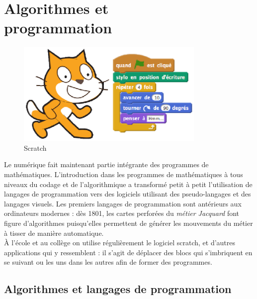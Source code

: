 \chapter{Algorithmes et\\programmation} \label{T15}

\newcommand{\fourmi}[3]{\rput{#3}(#1,#2){\psdot[linecolor=red,dotstyle=triangle*,linewidth=1mm](0,0)}}

\bigskip

\begin{figure}[h]
   \centering
      \includegraphics[height=5cm]{Transversal/Images/T15_intro_Scratch}
   \caption{Scratch}
\end{figure}

\begin{prerequis}
   Le numérique fait maintenant partie intégrante des programmes de mathématiques. L'introduction dans les programmes de mathématiques à tous niveaux du codage et de l'algorithmique a transformé petit à petit l'utilisation de langages de programmation vers des logiciels utilisant des pseudo-langages et des langages visuels.
   Les premiers langages de programmation sont antérieurs aux ordinateurs modernes : dès 1801, les cartes perforées du {\it métier Jacquard} font figure d'algorithmes puisqu'elles permettent de générer les mouvements du métier à tisser de manière automatique. \\
   À l'école et au collège on utilise régulièrement le logiciel scratch, et d'autres applications qui y ressemblent : il s'agit de déplacer des blocs qui s'imbriquent en se suivant ou les uns dans les autres afin de former des programmes.
\end{prerequis}


\cours


\section{Algorithmes et langages de programmation} %

